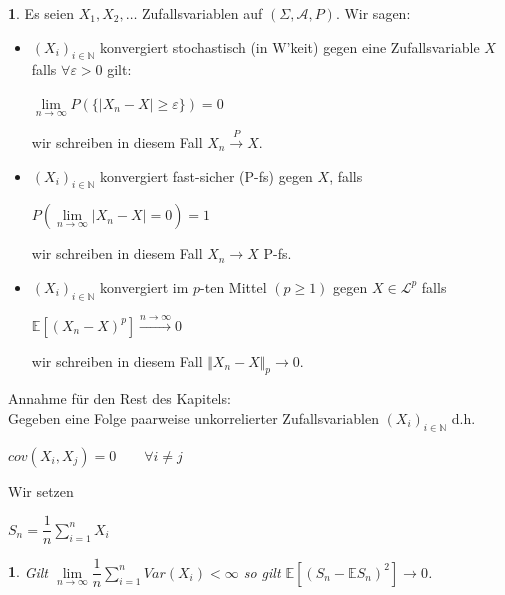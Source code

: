 \documentclass[10pt,a4paper]{report}
\numberwithin{equation}{section}
\numberwithin{figure}{section}
\theoremstyle{plain}
\theoremstyle{definition}
\newtheorem{defn}[thm]{\protect\definitionname}
\theoremstyle{remark}
\theoremstyle{plain}
\newtheorem{prop}[thm]{\protect\propositionname}
\providecommand{\definitionname}{Definition}
\providecommand{\propositionname}{Satz}
\newcommand{\1}{ \mathbb{1} } %
\begin{document}
\begin{defn}    %
  Es seien $X_1,X_2,\ldots$ Zufallsvariablen auf $(\Sigma,\mathcal{A},P)$. Wir
  sagen:
  \begin{itemize}
  \item $(X_i)_{i \in \mathbb{N}}$ konvergiert stochastisch (in
    W'keit) gegen eine Zufallsvariable $X$ falls $\forall\varepsilon >0$ gilt:
    \begin{center}
      $\lim\limits_{n \to \infty}P(\{|X_n-X|\geq \varepsilon\})=0$
    \end{center}
    wir schreiben in diesem Fall $X_n \overset{P}{\to} X$.
  \item $(X_i)_{i \in \mathbb{N}}$ konvergiert fast-sicher (P-fs)
    gegen $X$, falls
    \begin{center}
      $P\left(\lim\limits_{n \to \infty}|X_n-X|=0\right)=1$
    \end{center}
    wir schreiben in diesem Fall $X_n \to X$ P-fs.
  \item $(X_i)_{i \in \mathbb{N}}$ konvergiert im $p$-ten Mittel
    $(p\geq 1)$ gegen $X \in \mathcal{L}^p$ falls
    \begin{center}
      $\mathbb{E}[(X_n-X)^p] \overset{n \to \infty}{\to}0$
    \end{center}
    wir schreiben in diesem Fall $\Vert X_n-X\Vert_p \to 0$.\\
  \end{itemize}
  Annahme für den Rest des Kapitels:\\
  Gegeben eine Folge paarweise unkorrelierter Zufallsvariablen $(X_i)_{i \in
    \mathbb{N}}$ d.h.
  \begin{center}
    $cov(X_i,X_j)=0 \qquad \forall i\neq j$
  \end{center}
  Wir setzen
  \begin{center}
    $S_n=\dfrac{1}{n}\sum\limits_{i=1}^nX_i$
  \end{center}
\end{defn}
\begin{prop}  %
  Gilt $\lim\limits_{n \to \infty} \dfrac{1}{n}\sum\limits_{i=1}^nVar(X_i)<\infty$ so gilt $\mathbb{E}[(S_n-\mathbb{E}S_n)^2]\to 0$.
\end{prop}
\end{document}
